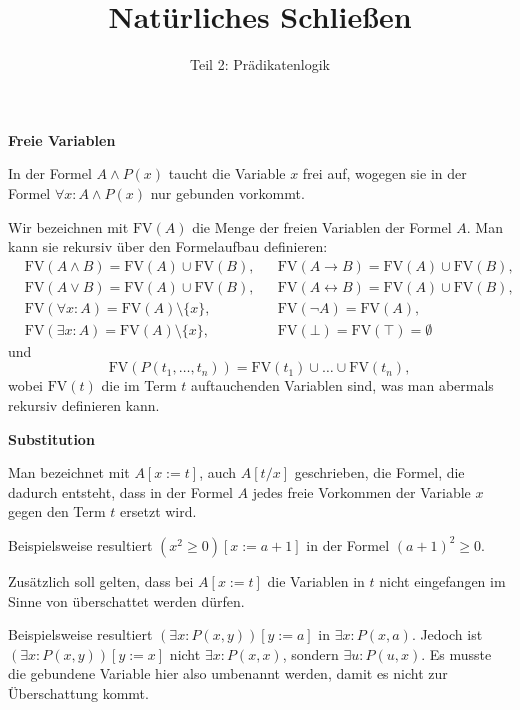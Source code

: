\documentclass[8pt]{beamer}
\title{Natürliches Schließen}
\subtitle{Teil 2: Prädikatenlogik}
\date{}
\newcommand{\strong}[1]{\textsf{\textbf{#1}}}
\newcommand{\centerheadline}[1]{%
  \begin{center}\strong{#1}\end{center}}
\newcommand{\parspace}{\vspace{0.8em}}
\newcommand{\cond}{\rightarrow}
\newcommand{\FV}{\mathrm{FV}}
\begin{document}
\begin{frame}
\maketitle
\end{frame}

\begin{frame}
\centerheadline{Freie Variablen}
\end{frame}

\begin{frame}
In der Formel $A\land P(x)$ taucht die Variable $x$ frei auf,
wogegen sie in der Formel $\forall x\colon A\land P(x)$ nur gebunden
vorkommt.\pause

\parspace
Wir bezeichnen mit $\FV(A)$ die Menge der freien Variablen
der Formel $A$. Man kann sie rekursiv über den Formelaufbau definieren:
\begin{align*}
& \FV(A\land B) = \FV(A)\cup\FV(B), && \FV(A\cond B) = \FV(A)\cup\FV(B),\\
& \FV(A\lor B)  = \FV(A)\cup\FV(B), && \FV(A\leftrightarrow B) = \FV(A)\cup\FV(B),\\
& \FV(\forall x\colon A) = \FV(A)\setminus\{x\}, && \FV(\neg A) = \FV(A),\\
& \FV(\exists x\colon A) = \FV(A)\setminus\{x\}, && \FV(\bot) = \FV(\top) = \emptyset
\end{align*}
und
\[\FV(P(t_1,\ldots,t_n)) = \FV(t_1)\cup\ldots\cup\FV(t_n),\]
wobei $\FV(t)$ die im Term $t$ auftauchenden Variablen sind, was
man abermals rekursiv definieren kann.
\end{frame}

\begin{frame}
\centerheadline{Substitution}
\end{frame}

\begin{frame}
Man bezeichnet mit $A[x:=t]$, auch $A[t/x]$ geschrieben, die Formel,
die dadurch entsteht, dass in der Formel $A$ jedes freie Vorkommen
der Variable $x$ gegen den Term $t$ ersetzt wird.\pause

\parspace
Beispielsweise resultiert $(x^2\ge 0)[x:=a+1]$ in der Formel $(a+1)^2\ge 0$.\pause

\parspace
Zusätzlich soll gelten, dass bei $A[x:=t]$ die Variablen in $t$ nicht
eingefangen im Sinne von überschattet werden dürfen.\pause

\parspace
Beispielsweise resultiert $(\exists x\colon P(x,y))[y:=a]$ in
$\exists x\colon P(x,a)$. Jedoch ist $(\exists x\colon P(x,y))[y:=x]$
nicht $\exists x\colon P(x,x)$, sondern $\exists u\colon P(u,x)$.
Es musste die gebundene Variable hier also umbenannt werden, damit
es nicht zur Überschattung kommt.
\end{frame}
\end{document}
